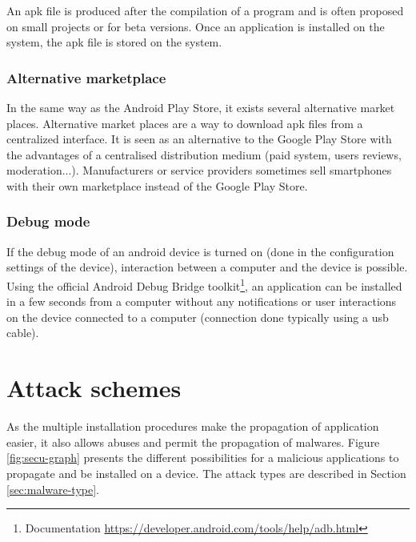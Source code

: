 An apk file is produced after the compilation of a program and is often proposed on small projects or for beta versions.
Once an application is installed on the system, the apk file is stored on the system.

\subsubsection{Alternative marketplace}
In the same way as the Android Play Store, it exists several alternative market places.
Alternative market places are a way to download apk files from a centralized interface.
It is seen as an alternative to the Google Play Store with the advantages of a centralised distribution medium (paid system, users reviews, moderation...).
Manufacturers or service providers sometimes sell smartphones with their own marketplace instead of the Google Play Store.\\


\subsubsection{Debug mode}
If the debug mode of an android device is turned on (done in the configuration settings of the device), interaction between a computer and the device is possible.
Using the official Android Debug Bridge toolkit\footnote{Documentation \url{https://developer.android.com/tools/help/adb.html}}, an application can be installed in a few seconds from a computer without any notifications or user interactions on the device connected to a computer (connection done typically using a usb cable).

\section{Attack schemes}

As the multiple installation procedures make the propagation of application easier, it also allows abuses and permit the propagation of malwares.
Figure \ref{fig:secu-graph} presents the different possibilities for a malicious applications to propagate and be installed on a device.
The attack types are described in Section \ref{sec:malware-type}.

